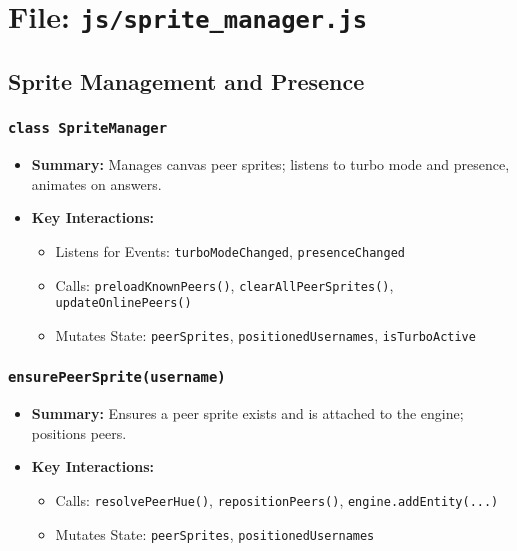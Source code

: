 \documentclass[11pt,letterpaper]{article}
\begin{document}
\section{File: \texttt{js/sprite\_manager.js}}

\subsection{Sprite Management and Presence}

\subsubsection{\texttt{class SpriteManager}}
\begin{itemize}
    \item \textbf{Summary:} Manages canvas peer sprites; listens to turbo mode and presence, animates on answers.
    \item \textbf{Key Interactions:}
    \begin{itemize}
        \item Listens for Events: \texttt{turboModeChanged}, \texttt{presenceChanged}
        \item Calls: \texttt{preloadKnownPeers()}, \texttt{clearAllPeerSprites()}, \texttt{updateOnlinePeers()}
        \item Mutates State: \texttt{peerSprites}, \texttt{positionedUsernames}, \texttt{isTurboActive}
    \end{itemize}
\end{itemize}

\subsubsection{\texttt{ensurePeerSprite(username)}}
\begin{itemize}
    \item \textbf{Summary:} Ensures a peer sprite exists and is attached to the engine; positions peers.
    \item \textbf{Key Interactions:}
    \begin{itemize}
        \item Calls: \texttt{resolvePeerHue()}, \texttt{repositionPeers()}, \texttt{engine.addEntity(...)}
        \item Mutates State: \texttt{peerSprites}, \texttt{positionedUsernames}
    \end{itemize}
\end{itemize}
\end{document}
